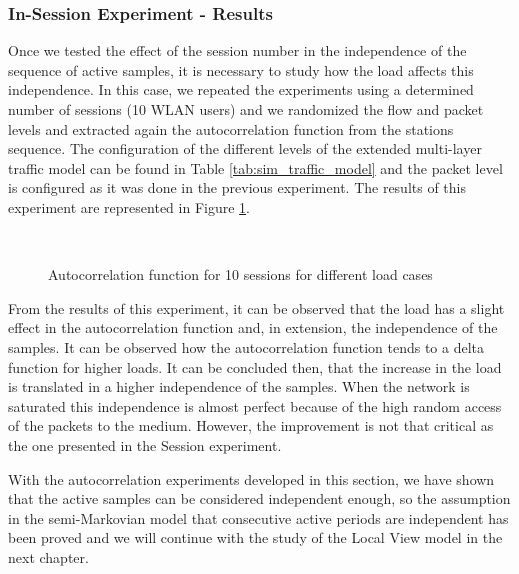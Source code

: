 \subsubsection{In-Session Experiment - Results} \label{subsec:autocorrelation_insessions}
Once we tested the effect of the session number in the independence of the sequence of active samples, it is necessary to study how the load affects this independence. In this case, we repeated the experiments using a determined number of sessions (10 \acs{WLAN} users) and we randomized the flow and packet levels and extracted again the autocorrelation function from the stations sequence. The configuration of the different levels of the extended multi-layer traffic model can be found in Table \ref{tab:sim_traffic_model} and the packet level is configured as it was done in the previous experiment. The results of this experiment are represented in Figure \ref{fig:autocorrelation_insessions}.

\begin{figure}[h!]
	\centering
	\\
	\caption{Autocorrelation function for 10 sessions for different load cases}
	\label{fig:autocorrelation_insessions}
\end{figure}

From the results of this experiment, it can be observed that the load has a slight effect in the autocorrelation function and, in extension, the independence of the samples. It can be observed how the autocorrelation function tends to a delta function for higher loads. It can be concluded then, that the increase in the load is translated in a higher independence of the samples. When the network is saturated this independence is almost perfect because of the high random access of the packets to the medium. However, the improvement is not that critical as the one presented in the Session experiment.

With the autocorrelation experiments developed in this section, we have shown that the active samples can be considered independent enough, so the assumption in the semi-Markovian model that consecutive active periods are independent has been proved and we will continue with the study of the Local View model in the next chapter.